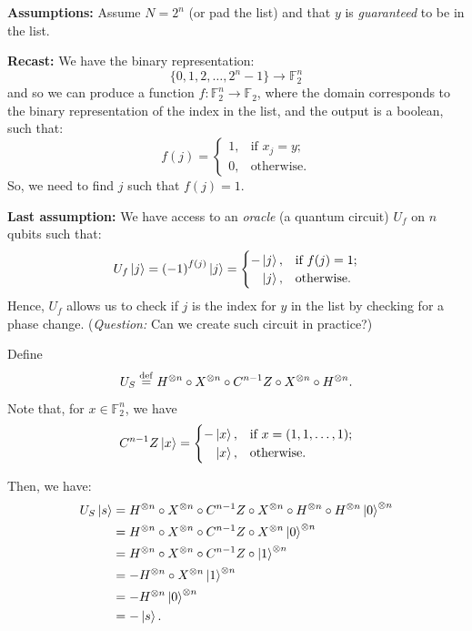 \documentclass[12pt]{amsart}
\theoremstyle{plain}
\theoremstyle{definition}
\theoremstyle{remarks}
\newcommand{\F}{\mathbb{F}}
\newcommand{\idef}{\overset{{\rm def}}{=}}
\begin{document}
\textbf{Assumptions:} Assume $N = 2^n$ (or pad the list) and that $y$ is \emph{guaranteed} to be in the list.

\textbf{Recast:} We have the binary representation:
\[
  \{0, 1, 2, \ldots , 2^n - 1\} \to \F_2^n
\]
and so we can produce a function $f : \F_2^n \to \F_2$, where the domain corresponds to the binary representation of the index in the list, and the output is a boolean, such that:
\[
  f(j) =
  \begin{cases}
    1,& \text{if $x_j = y$}; \\
    0,& \text{otherwise.}
  \end{cases}
\]
So, we need to find $j$ such that $f(j) = 1$.

\textbf{Last assumption:} We have access to an \emph{oracle} (a quantum circuit) $U_f$ on $n$ qubits such that:
\[
  U_f \ket{j} = {(-1)}^{f(j)} \ket{j} =
  \begin{cases}
    - \ket{j},& \text{if $f(j)=1$}; \\
    \phantom{-}\ket{j}, & \text{otherwise}.
  \end{cases}
\]
Hence, $U_f$ allows us to check if $j$ is the index for $y$ in the list by checking for a phase change.  (\emph{Question:} Can we create such circuit in practice?)

Define
\[
  U_S \idef H^{\otimes n} \circ X^{\otimes n} \circ C^{n-1}Z \circ X^{\otimes n} \circ H^{\otimes n}.
\]
Note that, for $x \in \F_2^n$, we have
\[
  C^{n-1}Z \ket{x} =
  \begin{cases}
    - \ket{x},& \text{if $x = (1, 1, \ldots , 1)$}; \\
    \phantom{-}\ket{x}, & \text{otherwise}.
  \end{cases}
\]

Then, we have:
\begin{align*}
  U_S \ket{s}
  & =  H^{\otimes n} \circ X^{\otimes n} \circ C^{n-1}Z \circ X^{\otimes n} \circ H^{\otimes n} \circ H^{\otimes n} \ket{0}^{\otimes n} \\
  & =  H^{\otimes n} \circ X^{\otimes n} \circ C^{n-1}Z \circ X^{\otimes n} \ket{0}^{\otimes n} \\
  & =  H^{\otimes n} \circ X^{\otimes n} \circ C^{n-1}Z \circ \ket{1}^{\otimes n} \\
  & =  -H^{\otimes n} \circ X^{\otimes n} \ket{1}^{\otimes n} \\
  & =  -H^{\otimes n} \ket{0}^{\otimes n} \\
  & = - \ket{s}.
\end{align*}
\end{document}
